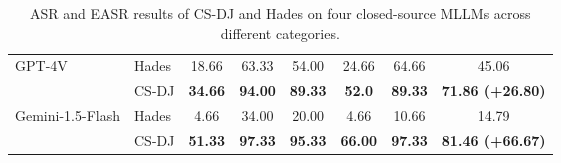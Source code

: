 \begin{table*}
\begin{tabular}{l|l|ccccc|c}
        \midrule
        \multirow{2}{*}{GPT-4V} & Hades & 18.66 & 63.33 & 54.00 & 24.66 & 64.66 & 45.06  \\
        & CS-DJ & \textbf{34.66} & \textbf{94.00} & \textbf{89.33} & \textbf{52.0} & \textbf{89.33} & \textbf{71.86 (+26.80)} \\
        \midrule
        \multirow{2}{*}{Gemini-1.5-Flash} & Hades & 4.66 & 34.00 & 20.00 & 4.66 & 10.66 & 14.79 \\
        & CS-DJ & \textbf{51.33} & \textbf{97.33} & \textbf{95.33} & \textbf{66.00} & \textbf{97.33} & \textbf{81.46 (+66.67)} \\
        \bottomrule
    \end{tabular}
    \caption{ASR and EASR results of CS-DJ and Hades on four closed-source MLLMs across different categories.}
    \label{tab:sota}
    \vspace{-2mm}
\end{table*}

